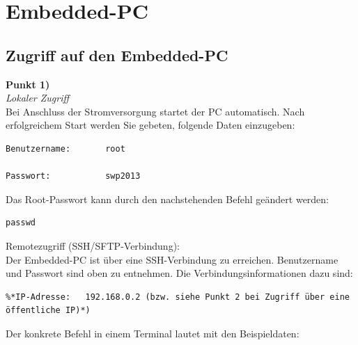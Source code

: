 \documentclass[fontsize = 12pt, paper = a4]{scrreprt}
\begin{document}
\section{Embedded-PC}

\subsection{Zugriff auf den Embedded-PC}

\textbf{Punkt 1)} \\

\textit{Lokaler Zugriff} \\

Bei Anschluss der Stromversorgung startet der PC automatisch.
Nach erfolgreichem Start werden Sie gebeten, folgende Daten einzugeben:

\vspace*{4mm}
\begin{lstlisting}[frame=single]
Benutzername:		root

Passwort:		    swp2013

\end{lstlisting} 
\vspace*{-2mm}

Das Root-Passwort kann durch den nachstehenden Befehl geändert werden:

\vspace*{4mm}
\begin{lstlisting}[frame=single]
passwd
\end{lstlisting} 
\vspace*{-2mm}


Remotezugriff (SSH/SFTP-Verbindung): \\

Der Embedded-PC ist über eine SSH-Verbindung zu erreichen. 
Benutzername und Passwort sind oben zu entnehmen. 
Die Verbindungsinformationen dazu sind:

\vspace*{4mm}
\begin{lstlisting}[frame=single]
%*Port:  		22 *)
%*IP-Adresse: 	192.168.0.2 (bzw. siehe Punkt 2 bei Zugriff über eine öffentliche IP)*)

\end{lstlisting} 
\vspace*{-2mm}

Der konkrete Befehl in einem Terminal lautet mit den Beispieldaten:
\end{document}
